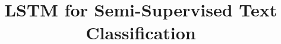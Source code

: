 \documentclass[12pt]{article}
\begin{document}
\title{LSTM for Semi-Supervised Text Classification}
\end{document}
